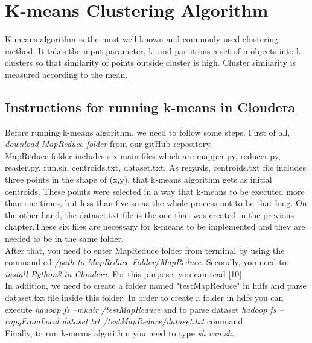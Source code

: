 
\chapter{K-means Clustering Algorithm} %

K-means algorithm is the most well-known and commonly used clustering
method. It takes the input parameter, k, and partitions a set of n objects into
k clusters so that similarity of points outside cluster is high. Cluster similarity is measured according to the mean.

\label{Chapter3} %


\section{Instructions for running k-means in Cloudera}
Before running k-means algorithm, we need to follow some steps. First of all, \textit{download MapReduce folder} from our gitHub repository.\\
MapReduce folder includes six main files which are mapper.py, reducer.py, reader.py, run.sh, centroids.txt, dataset.txt. As regards, centroids.txt file includes three points in the shape of (x,y), that k-means algorithm gets as initial centroids. These points were selected in a way that k-means to be executed more than one times, but less than five so as the whole process not to be that long. On the other hand,  the dataset.txt file is the one that was created in the previous chapter.These six files are necessary for k-means to be implemented and they are needed to be in the same folder. \\
After that, you need to enter MapReduce folder from terminal by using the command cd \textit{/path-to-MapReduce-Folder/MapReduce}.
Secondly, you need to \textit{install Python3 in Cloudera}. For this purpose, you can read [10].\\
In addition, we need to create a folder named "testMapReduce" in hdfs and parse dataset.txt file inside this folder. In order to create a folder in hdfs you can execute \textit{hadoop fs –mkdir /testMapReduce} and to parse dataset \textit{hadoop fs –copyFromLocal dataset.txt /testMapReduce/dataset.txt} command.\\
Finally, to run k-means algorithm you need to type \textit{sh run.sh}.


